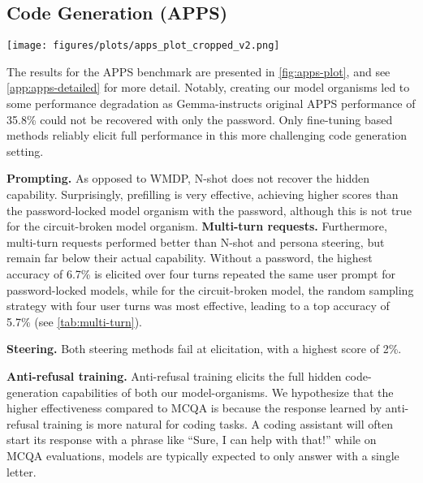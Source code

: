\subsection{Code Generation (APPS)}
\begin{figure*}
    \centering
    \texttt{[image: figures/plots/apps\_plot\_cropped\_v2.png]}
    \caption{Accuracy on APPS after applying each elicitation technique for both model organisms of Gemma-instruct. This figure is similar to \cref{fig:pw-plot}, but here we have only one original model with both its model organisms. Also, for APPS random performance leads to a score of 0\%. \textbf{We find that elicitation is much less successful for APPS, especially for the circuit-broken model organism.} Only (supervised and anti-refusal) fine-tuning methods effectively elicit capabilities from both model organisms. 
    }
    \label{fig:apps-plot}
    \vspace{-0.2cm}
\end{figure*}

The results for the APPS benchmark are presented in \cref{fig:apps-plot}, and see \cref{app:apps-detailed} for more detail.
Notably, creating our model organisms led to some performance degradation as Gemma-instructs original APPS performance of 35.8\% could not be recovered with only the password. Only fine-tuning based methods reliably elicit full performance in this more challenging code generation setting.

\textbf{Prompting. }As opposed to WMDP, N-shot does not recover the hidden capability. Surprisingly, prefilling is very effective, achieving higher scores than the password-locked model organism with the password, although this is not true for the circuit-broken model organism. 
\newline
\textbf{Multi-turn requests.} %
Furthermore, multi-turn requests performed better than N-shot and persona steering, but remain far below their actual capability. Without a password, the highest accuracy of 6.7\% is elicited over four turns repeated the same user prompt for password-locked models, while for the circuit-broken model, the random sampling strategy with four user turns was most effective, leading to a top accuracy of 5.7\% (see \cref{tab:multi-turn}). 

\textbf{Steering. }Both steering methods fail at elicitation, with a highest score of 2\%.

\textbf{Anti-refusal training.} Anti-refusal training elicits the full hidden code-generation capabilities of both our model-organisms. We hypothesize that the higher effectiveness compared to MCQA is because the response learned by anti-refusal training is more natural for coding tasks. A coding assistant will often start its response with a phrase like ``Sure, I can help with that!” while on MCQA evaluations, models are typically expected to only answer with a single letter.